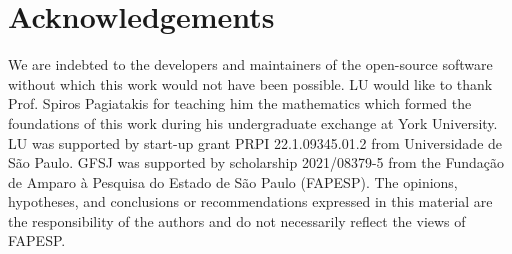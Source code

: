 \section*{Acknowledgements}

We are indebted to the developers and maintainers of the open-source software
without which this work would not have been possible.
LU would like to thank Prof. Spiros Pagiatakis for teaching him the mathematics which formed the foundations of this work during his undergraduate exchange at York University.
LU was supported by start-up grant PRPI 22.1.09345.01.2 from Universidade de São Paulo.
GFSJ was supported by scholarship 2021/08379-5 from the Fundação de Amparo à Pesquisa do Estado de São Paulo (FAPESP).
The opinions, hypotheses, and conclusions or recommendations expressed in this material are the responsibility of the authors and do not necessarily reflect the views of FAPESP.

